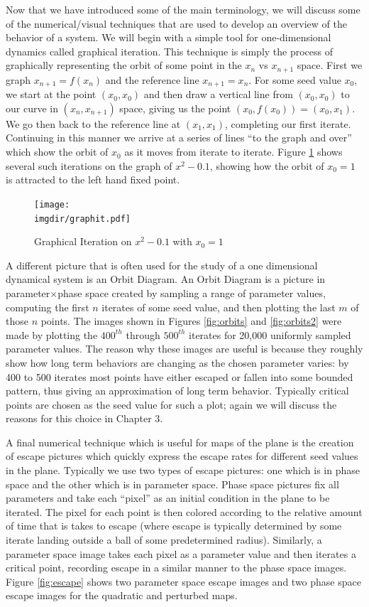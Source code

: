 Now that we have introduced some of the main terminology, we will discuss some of the numerical/visual techniques that are used to develop an overview of the behavior of a system. We will begin with a simple tool for one-dimensional dynamics called graphical iteration. This technique is simply the process of graphically representing the orbit of some point in the $x_{n}$ vs $x_{n+1}$ space. First we graph $x_{n+1} = f (x_n)$ and the reference line $x_{n+1} = x_n$. For some seed value $x_0$, we start at the point $ (x_0, x_0)$ and then draw a vertical line from $ (x_0, x_0)$ to our curve in $ (x_n, x_{n+1})$ space, giving us the point $ (x_0, f (x_0)) = (x_0, x_1)$. We go then back to the reference line at $ (x_1,x_1)$, completing our first iterate. Continuing in this manner we arrive at a series of lines ``to the graph and over'' which show the orbit of $x_0$ as it moves from iterate to iterate. Figure \ref{graphit} shows several such iterations on the graph of $x^2 - 0.1$, showing how the orbit of $x_0 =1$ is attracted to the left hand fixed point.

\begin{figure}[h]
	\centering
	\texttt{[image: \\imgdir/graphit.pdf]}
	\caption{Graphical Iteration on $x^2 - 0.1$ with $x_0 = 1$}
	\label{graphit}
\end{figure}

A different picture that is often used for the study of a one dimensional dynamical system is an Orbit Diagram. An Orbit Diagram is a picture in parameter$\times$phase space created by sampling a range of parameter values, computing the first $n$ iterates of some seed value, and then plotting the last $m$ of those $n$ points. The images shown in Figures \ref{fig:orbits} and \ref{fig:orbits2} were made by plotting the $400^{th}$ through $500^{th}$ iterates for 20,000 uniformly sampled parameter values. The reason why these images are useful is because they roughly show how long term behaviors are changing as the chosen parameter varies: by 400 to 500 iterates most points have either escaped or fallen into some bounded pattern, thus giving an approximation of long term behavior. Typically critical points are chosen as the seed value for such a plot; again we will discuss the reasons for this choice in Chapter 3.

A final numerical technique which is useful for maps of the plane is the creation of escape pictures which quickly express the escape rates for different seed values in the plane. Typically we use two types of escape pictures: one which is in phase space and the other which is in parameter space. Phase space pictures fix all parameters and take each ``pixel'' as an initial condition in the plane to be iterated. The pixel for each point is then colored according to the relative amount of time that is takes to escape (where escape is typically determined by some iterate landing outside a ball of some predetermined radius). Similarly, a parameter space image takes each pixel as a parameter value and then iterates a critical point, recording escape in a similar manner to the phase space images. Figure \ref{fig:escape} shows two parameter space escape images and two phase space escape images for the quadratic and perturbed maps.

